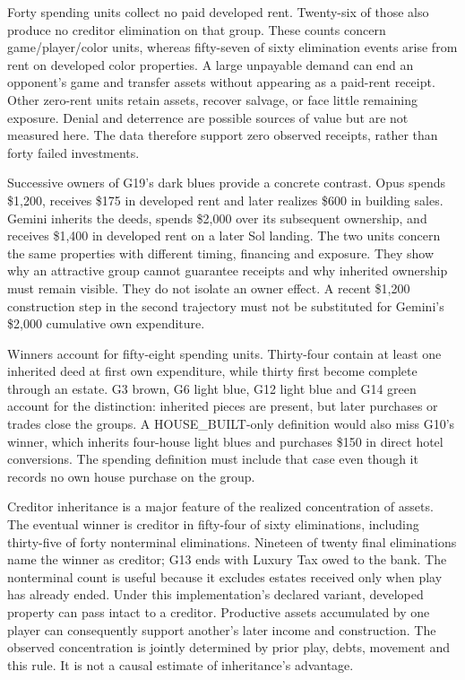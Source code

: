 Forty spending units collect no paid developed rent. Twenty-six of those also produce no creditor elimination on that group. These counts concern game/player/color units, whereas fifty-seven of sixty elimination events arise from rent on developed color properties. A large unpayable demand can end an opponent's game and transfer assets without appearing as a paid-rent receipt. Other zero-rent units retain assets, recover salvage, or face little remaining exposure. Denial and deterrence are possible sources of value but are not measured here. The data therefore support zero observed receipts, rather than forty failed investments.

Successive owners of G19's dark blues provide a concrete contrast. Opus spends \$1,200, receives \$175 in developed rent and later realizes \$600 in building sales. Gemini inherits the deeds, spends \$2,000 over its subsequent ownership, and receives \$1,400 in developed rent on a later Sol landing. The two units concern the same properties with different timing, financing and exposure. They show why an attractive group cannot guarantee receipts and why inherited ownership must remain visible. They do not isolate an owner effect. A recent \$1,200 construction step in the second trajectory must not be substituted for Gemini's \$2,000 cumulative own expenditure.

Winners account for fifty-eight spending units. Thirty-four contain at least one inherited deed at first own expenditure, while thirty first become complete through an estate. G3 brown, G6 light blue, G12 light blue and G14 green account for the distinction: inherited pieces are present, but later purchases or trades close the groups. A HOUSE\_BUILT-only definition would also miss G10's winner, which inherits four-house light blues and purchases \$150 in direct hotel conversions. The spending definition must include that case even though it records no own house purchase on the group.

Creditor inheritance is a major feature of the realized concentration of assets. The eventual winner is creditor in fifty-four of sixty eliminations, including thirty-five of forty nonterminal eliminations. Nineteen of twenty final eliminations name the winner as creditor; G13 ends with Luxury Tax owed to the bank. The nonterminal count is useful because it excludes estates received only when play has already ended. Under this implementation's declared variant, developed property can pass intact to a creditor. Productive assets accumulated by one player can consequently support another's later income and construction. The observed concentration is jointly determined by prior play, debts, movement and this rule. It is not a causal estimate of inheritance's advantage.
